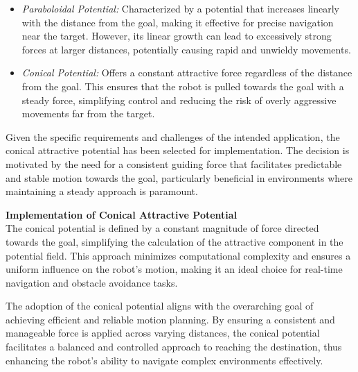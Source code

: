 \begin{itemize}
    \item \textit{Paraboloidal Potential:} Characterized by a potential that increases linearly with the distance from the goal, making it effective for precise navigation near the target. However, its linear growth can lead to excessively strong forces at larger distances, potentially causing rapid and unwieldy movements.
    \item \textit{Conical Potential:} Offers a constant attractive force regardless of the distance from the goal. This ensures that the robot is pulled towards the goal with a steady force, simplifying control and reducing the risk of overly aggressive movements far from the target.
\end{itemize}

Given the specific requirements and challenges of the intended application, the conical attractive potential has been selected for implementation. The decision is motivated by the need for a consistent guiding force that facilitates predictable and stable motion towards the goal, particularly beneficial in environments where maintaining a steady approach is paramount.

\textbf{Implementation of Conical Attractive Potential}\\
The conical potential is defined by a constant magnitude of force directed towards the goal, simplifying the calculation of the attractive component in the potential field. This approach minimizes computational complexity and ensures a uniform influence on the robot's motion, making it an ideal choice for real-time navigation and obstacle avoidance tasks.

The adoption of the conical potential aligns with the overarching goal of achieving efficient and reliable motion planning. By ensuring a consistent and manageable force is applied across varying distances, the conical potential facilitates a balanced and controlled approach to reaching the destination, thus enhancing the robot's ability to navigate complex environments effectively.







